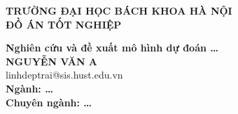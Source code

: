 \documentclass[main.tex]{subfiles}
\begin{document}
\begin{titlepage}
\thispagestyle{empty}
\begin{center}

{\textbf{\large{TRƯỜNG ĐẠI HỌC BÁCH KHOA HÀ NỘI}}}\\[4cm]

{\textbf{\huge{ ĐỒ ÁN TỐT NGHIỆP}}}\\[1cm]
{\textbf{\Large{Nghiên cứu và đề xuất mô hình dự đoán \ldots }}\\[1cm]

{\textbf{\large{NGUYỄN VĂN A}}}\\
{\large{linhdeptrai@sis.hust.edu.vn}}\\[0.5cm]

{\textbf{\large{Ngành: \ldots }}}\\
{\textbf{\large{Chuyên ngành: \ldots }}}\\

\vspace{2cm}
\begin{table}[H]
\centering
{}
\end{table}}
\end{center}



\end{titlepage}
\end{document}
